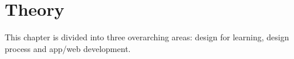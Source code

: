 \chapter{Theory}\label{cha:Theory}
%

This chapter is divided into three overarching areas: design for learning, design process and app/web development.






